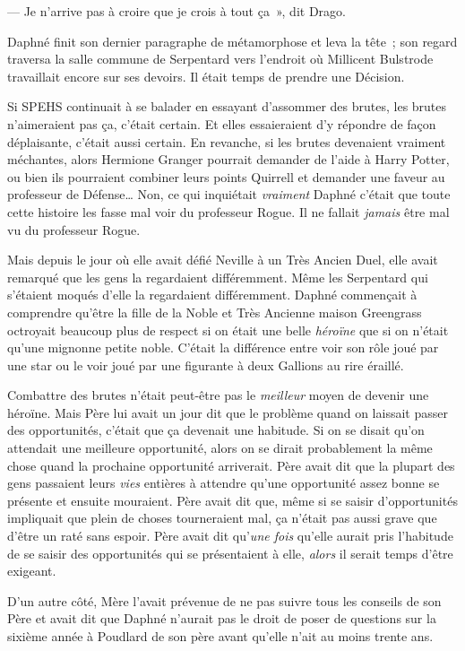 --- Je n'arrive pas à croire que je crois à tout ça~», dit Drago.

\later

Daphné finit son dernier paragraphe de métamorphose et leva la tête~; son regard traversa la salle commune de Serpentard vers l'endroit où Millicent Bulstrode travaillait encore sur ses devoirs. Il était temps de prendre une Décision.

Si SPEHS continuait à se balader en essayant d'assommer des brutes, les brutes n'aimeraient pas ça, c'était certain. Et elles essaieraient d'y répondre de façon déplaisante, c'était aussi certain. En revanche, si les brutes devenaient vraiment méchantes, alors Hermione Granger pourrait demander de l'aide à Harry Potter, ou bien ils pourraient combiner leurs points Quirrell et demander une faveur au professeur de Défense… Non, ce qui inquiétait \emph{vraiment} Daphné c'était que toute cette histoire les fasse mal voir du professeur Rogue. Il ne fallait \emph{jamais} être mal vu du professeur Rogue.

Mais depuis le jour où elle avait défié Neville à un Très Ancien Duel, elle avait remarqué que les gens la regardaient différemment. Même les Serpentard qui s'étaient moqués d'elle la regardaient différemment. Daphné commençait à comprendre qu'être la fille de la Noble et Très Ancienne maison Greengrass octroyait beaucoup plus de respect si on était une belle \emph{héroïne} que si on n'était qu'une mignonne petite noble. C'était la différence entre voir son rôle joué par une star ou le voir joué par une figurante à deux Gallions au rire éraillé.

Combattre des brutes n'était peut-être pas le \emph{meilleur} moyen de devenir une héroïne. Mais Père lui avait un jour dit que le problème quand on laissait passer des opportunités, c'était que ça devenait une habitude. Si on se disait qu'on attendait une meilleure opportunité, alors on se dirait probablement la même chose quand la prochaine opportunité arriverait. Père avait dit que la plupart des gens passaient leurs \emph{vies} entières à attendre qu'une opportunité assez bonne se présente et ensuite mouraient. Père avait dit que, même si se saisir d'opportunités impliquait que plein de choses tourneraient mal, ça n'était pas aussi grave que d'être un raté sans espoir. Père avait dit qu'\emph{une fois} qu'elle aurait pris l'habitude de se saisir des opportunités qui se présentaient à elle, \emph{alors} il serait temps d'être exigeant.

D'un autre côté, Mère l'avait prévenue de ne pas suivre tous les conseils de son Père et avait dit que Daphné n'aurait pas le droit de poser de questions sur la sixième année à Poudlard de son père avant qu'elle n'ait au moins trente ans.

